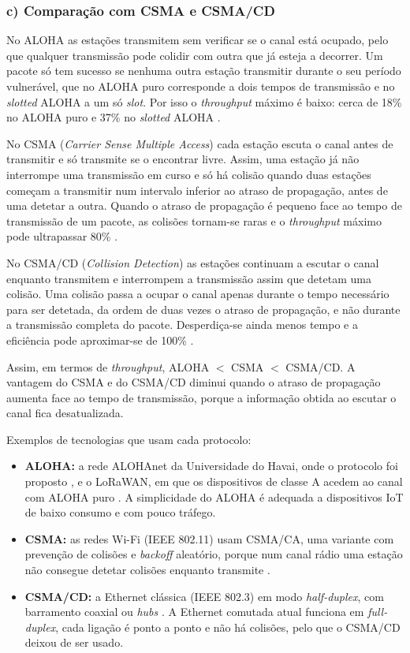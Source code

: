 \documentclass[10pt,a4paper]{article}
\begin{document}
\subsubsection*{c) Comparação com CSMA e CSMA/CD}

No ALOHA as estações transmitem sem verificar se o canal está ocupado, pelo que qualquer transmissão pode colidir com outra que já esteja a decorrer. Um pacote só tem sucesso se nenhuma outra estação transmitir durante o seu período vulnerável, que no ALOHA puro corresponde a dois tempos de transmissão e no \textit{slotted} ALOHA a um só \textit{slot}. Por isso o \textit{throughput} máximo é baixo: cerca de 18\% no ALOHA puro e 37\% no \textit{slotted} ALOHA \cite{bertsekas1992}.

No CSMA (\textit{Carrier Sense Multiple Access}) cada estação escuta o canal antes de transmitir e só transmite se o encontrar livre. Assim, uma estação já não interrompe uma transmissão em curso e só há colisão quando duas estações começam a transmitir num intervalo inferior ao atraso de propagação, antes de uma detetar a outra. Quando o atraso de propagação é pequeno face ao tempo de transmissão de um pacote, as colisões tornam-se raras e o \textit{throughput} máximo pode ultrapassar 80\% \cite{kleinrock1975}.

No CSMA/CD (\textit{Collision Detection}) as estações continuam a escutar o canal enquanto transmitem e interrompem a transmissão assim que detetam uma colisão. Uma colisão passa a ocupar o canal apenas durante o tempo necessário para ser detetada, da ordem de duas vezes o atraso de propagação, e não durante a transmissão completa do pacote. Desperdiça-se ainda menos tempo e a eficiência pode aproximar-se de 100\% \cite{metcalfe1976}.

Assim, em termos de \textit{throughput}, ALOHA $<$ CSMA $<$ CSMA/CD. A vantagem do CSMA e do CSMA/CD diminui quando o atraso de propagação aumenta face ao tempo de transmissão, porque a informação obtida ao escutar o canal fica desatualizada.

Exemplos de tecnologias que usam cada protocolo:
\begin{itemize}
  \item \textbf{ALOHA:} a rede ALOHAnet da Universidade do Havai, onde o protocolo foi proposto \cite{abramson1970}, e o LoRaWAN, em que os dispositivos de classe A acedem ao canal com ALOHA puro \cite{lorawan}. A simplicidade do ALOHA é adequada a dispositivos IoT de baixo consumo e com pouco tráfego.
  \item \textbf{CSMA:} as redes Wi-Fi (IEEE 802.11) usam CSMA/CA, uma variante com prevenção de colisões e \textit{backoff} aleatório, porque num canal rádio uma estação não consegue detetar colisões enquanto transmite \cite{ieee80211}.
  \item \textbf{CSMA/CD:} a Ethernet clássica (IEEE 802.3) em modo \textit{half-duplex}, com barramento coaxial ou \textit{hubs} \cite{ieee8023}. A Ethernet comutada atual funciona em \textit{full-duplex}, cada ligação é ponto a ponto e não há colisões, pelo que o CSMA/CD deixou de ser usado.
\end{itemize}
\newpage
\end{document}
